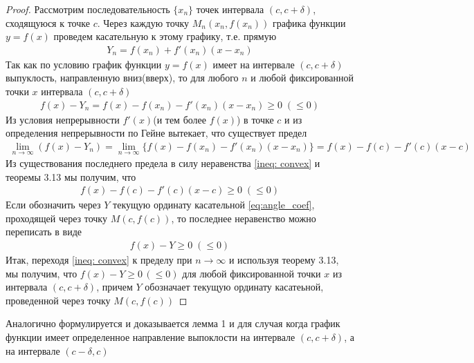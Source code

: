 \documentclass[10pt]{article}
\begin{document}
    \begin{proof}
        Рассмотрим последовательность $\{x_n\}$ точек интервала $(c, c+\delta)$, сходящуюся к точке $c$. Через каждую точку $M_n(x_n, f(x_n))$ графика функции $y = f(x)$ проведем касательную к этому графику, т.е. прямую
        \begin{gather*}
            Y_n = f(x_n) + f'(x_n)(x - x_n)
        \end{gather*}
        Так как по условию график функции $y = f(x)$ имеет на интервале $(c, c+\delta)$ выпуклость, направленную вниз(вверх), то для любого $n$ и любой фиксированной точки $x$ интервала $(c, c+\delta)$
        \begin{gather}
            f(x) - Y_n=f(x)-f(x_n) - f'(x_n)(x-x_n) \geq 0\; (\leq 0) \label{ineq: convex}
        \end{gather}
        Из условия непрерывности $f'(x)$(и тем более $f(x)$) в точке $c$ и из определения непрерывности по Гейне вытекает, что существует предел
        \begin{gather*}
            \lim_{n \to \infty}(f(x) - Y_n) = \lim_{n \to \infty}\{f(x) - f(x_n) - f'(x_n)(x-x_n)\} = f(x) - f(c) - f'(c)(x-c)
        \end{gather*}
        Из существования последнего предела в силу неравенства \ref{ineq: convex} и теоремы 3.13 мы получим, что
        \begin{gather*}
            f(x)-f(c)-f'(c)(x-c) \geq 0\; (\leq 0)
        \end{gather*}
        Если обозначить через $Y$ текущую ординату касательной \ref{eq:angle_coef}, проходящей через точку $M(c, f(c))$, то последнее неравенство можно переписать в виде
        \begin{gather*}
            f(x) - Y \geq 0\; (\leq 0)
        \end{gather*}
        Итак, переходя \ref{ineq: convex} к пределу при $n \to \infty$ и используя теорему 3.13, мы получим, что $f(x) - Y \geq 0\, (\leq 0)$ для любой фиксированной точки $x$ из интервала $(c, c+\delta)$, причем $Y$ обозначает текущую ординату касатеьной, проведенной через точку $M(c, f(c))$
        \end{proof}
        \begin{remark}
            Аналогично формулируется и доказывается лемма 1 и для случая когда график функции имеет определенное направление выпоклости на интервале $(c, c+\delta)$, а на интервале $(c-\delta, c)$
        \end{remark}
        \begin{lemma}
        \end{lemma}
\end{document}

